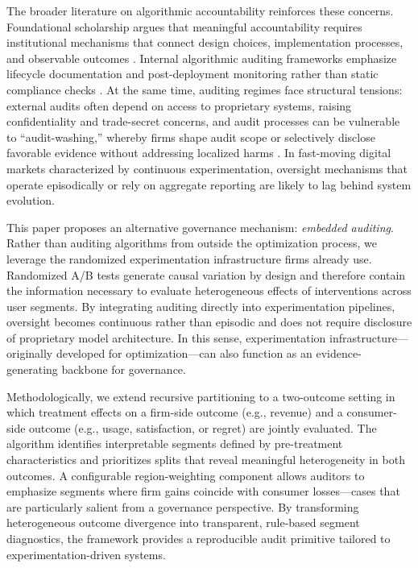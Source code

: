 \documentclass[11pt,letterpaper,english]{article}
\theoremstyle{definition}
\theoremstyle{definition}
\begin{document}
\begin{bibunit}
The broader literature on algorithmic accountability reinforces these concerns. Foundational scholarship argues that meaningful accountability requires institutional mechanisms that connect design choices, implementation processes, and observable outcomes \citep{kroll2017_accountable_algorithms}. Internal algorithmic auditing frameworks emphasize lifecycle documentation and post-deployment monitoring rather than static compliance checks \citep{raji2020_internal_audit}. At the same time, auditing regimes face structural tensions: external audits often depend on access to proprietary systems, raising confidentiality and trade-secret concerns, and audit processes can be vulnerable to “audit-washing,” whereby firms shape audit scope or selectively disclose favorable evidence without addressing localized harms \citep{goodman2022_auditwashing}. In fast-moving digital markets characterized by continuous experimentation, oversight mechanisms that operate episodically or rely on aggregate reporting are likely to lag behind system evolution.

This paper proposes an alternative governance mechanism: \emph{embedded auditing}. Rather than auditing algorithms from outside the optimization process, we leverage the randomized experimentation infrastructure firms already use. Randomized A/B tests generate causal variation by design and therefore contain the information necessary to evaluate heterogeneous effects of interventions across user segments. By integrating auditing directly into experimentation pipelines, oversight becomes continuous rather than episodic and does not require disclosure of proprietary model architecture. In this sense, experimentation infrastructure—originally developed for optimization—can also function as an evidence-generating backbone for governance.

Methodologically, we extend recursive partitioning \citep{athey2016recursive} to a two-outcome setting in which treatment effects on a firm-side outcome (e.g., revenue) and a consumer-side outcome (e.g., usage, satisfaction, or regret) are jointly evaluated. The algorithm identifies interpretable segments defined by pre-treatment characteristics and prioritizes splits that reveal meaningful heterogeneity in both outcomes. A configurable region-weighting component allows auditors to emphasize segments where firm gains coincide with consumer losses—cases that are particularly salient from a governance perspective. By transforming heterogeneous outcome divergence into transparent, rule-based segment diagnostics, the framework provides a reproducible audit primitive tailored to experimentation-driven systems.


\end{bibunit}
\end{document}
